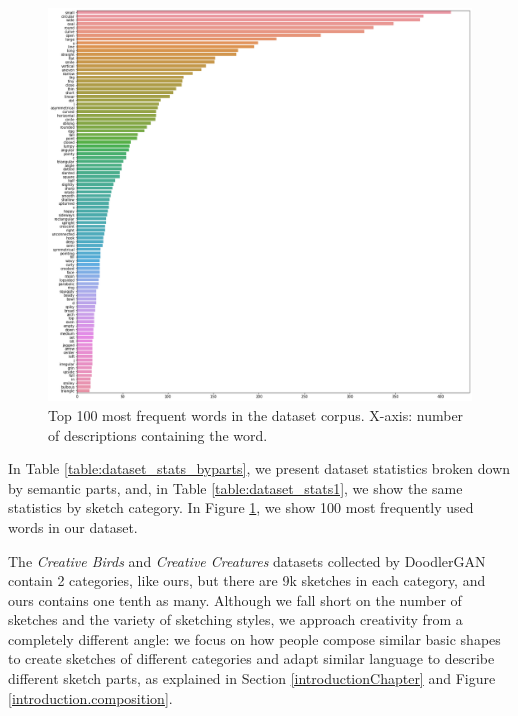 \begin{figure}[!htb]
\includegraphics[width=\linewidth]{dataset_image/word_freq_face.png}  
\caption{Top 100 most frequent words in the dataset corpus. X-axis: number of descriptions containing the word.}
\label{word_freq}
\end{figure}

In Table \ref{table:dataset_stats_byparts}, we present dataset statistics broken down by semantic parts, and, in Table \ref{table:dataset_stats1}, we show the same statistics by sketch category. In Figure \ref{word_freq}, we show 100 most frequently used words in our dataset. 

The \textit{Creative Birds} and \textit{Creative Creatures} datasets collected by DoodlerGAN \citep{doodlerGAN} contain 2 categories, like ours, but there are 9k sketches in each category, and ours contains one tenth as many. Although we fall short on the number of sketches and the variety of sketching styles, we approach creativity from a completely different angle: we focus on how people compose similar basic shapes to create sketches of different categories and adapt similar language to describe different sketch parts, as explained in Section \ref{introductionChapter} and Figure \ref{introduction.composition}.  

